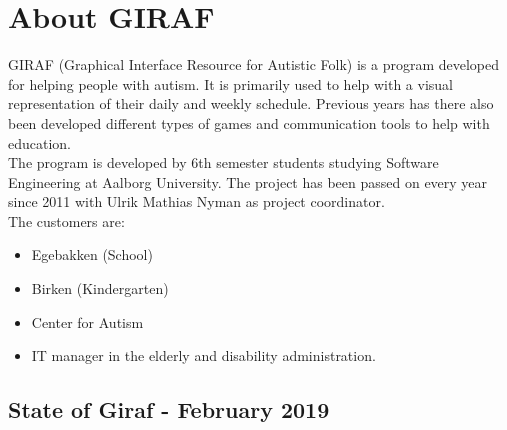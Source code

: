 \section{About GIRAF}
GIRAF (Graphical Interface Resource for Autistic Folk) is a program developed for helping people with autism. 
It is primarily used to help with a visual representation of their daily and weekly schedule. 
Previous years has there also been developed different types of games and communication tools to help with education. 
\\
The program is developed by 6th semester students studying Software Engineering at Aalborg University. 
The project has been passed on every year since 2011 with Ulrik Mathias Nyman as project coordinator. 
\\
The customers are: 
\begin{itemize}
    \item Egebakken (School)
    \item Birken (Kindergarten)
    \item Center for Autism
    \item IT manager in the elderly and disability administration.
\end{itemize}

\subsection{State of Giraf - February 2019}
